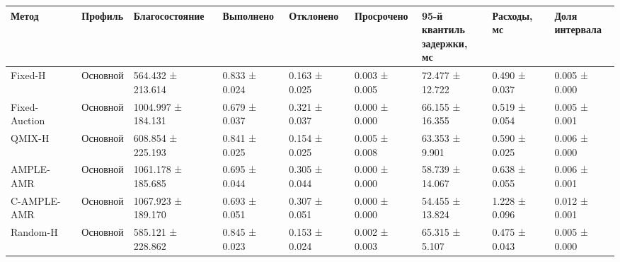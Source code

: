 \begin{tabular}{lllllllll}
\toprule
 Метод & Профиль & Благосостояние & Выполнено & Отклонено & Просрочено & \shortstack{95-й квантиль\\задержки, мс} & Расходы, мс & \shortstack{Доля\\интервала} \\
\midrule
 Fixed-H & Основной & 564.432 ± 213.614 & 0.833 ± 0.024 & 0.163 ± 0.025 & 0.003 ± 0.005 & 72.477 ± 12.722 & 0.490 ± 0.037 & 0.005 ± 0.000 \\
 Fixed-Auction & Основной & 1004.997 ± 184.131 & 0.679 ± 0.037 & 0.321 ± 0.037 & 0.000 ± 0.000 & 66.155 ± 16.355 & 0.519 ± 0.054 & 0.005 ± 0.001 \\
 QMIX-H & Основной & 608.854 ± 225.193 & 0.841 ± 0.025 & 0.154 ± 0.025 & 0.005 ± 0.008 & 63.353 ± 9.901 & 0.590 ± 0.025 & 0.006 ± 0.000 \\
 AMPLE-AMR & Основной & 1061.178 ± 185.685 & 0.695 ± 0.044 & 0.305 ± 0.044 & 0.000 ± 0.000 & 58.739 ± 14.067 & 0.638 ± 0.055 & 0.006 ± 0.001 \\
 C-AMPLE-AMR & Основной & 1067.923 ± 189.170 & 0.693 ± 0.051 & 0.307 ± 0.051 & 0.000 ± 0.000 & 54.455 ± 13.824 & 1.228 ± 0.096 & 0.012 ± 0.001 \\
 Random-H & Основной & 585.121 ± 228.862 & 0.845 ± 0.023 & 0.153 ± 0.024 & 0.002 ± 0.003 & 65.315 ± 5.107 & 0.475 ± 0.043 & 0.005 ± 0.000 \\
\bottomrule
\end{tabular}
